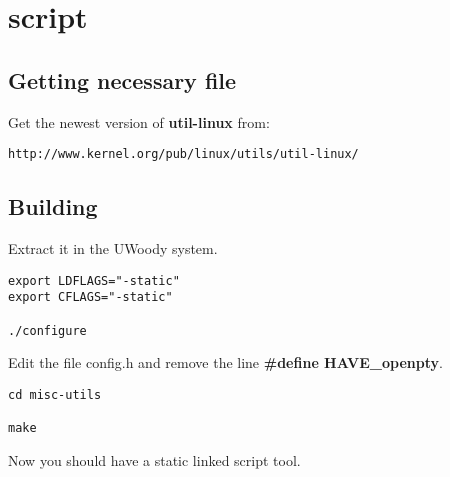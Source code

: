 \section{script}
\subsection{Getting necessary file}
Get the newest version of \textbf{util-linux} from:
\begin{verbatim}
http://www.kernel.org/pub/linux/utils/util-linux/
\end{verbatim}

\subsection{Building}
Extract it in the UWoody system.

\begin{verbatim}
export LDFLAGS="-static"
export CFLAGS="-static"

./configure
\end{verbatim}

Edit the file config.h and remove the line \textbf{\#define HAVE\_openpty}.

\begin{verbatim}
cd misc-utils

make
\end{verbatim}

Now you should have a static linked script tool.